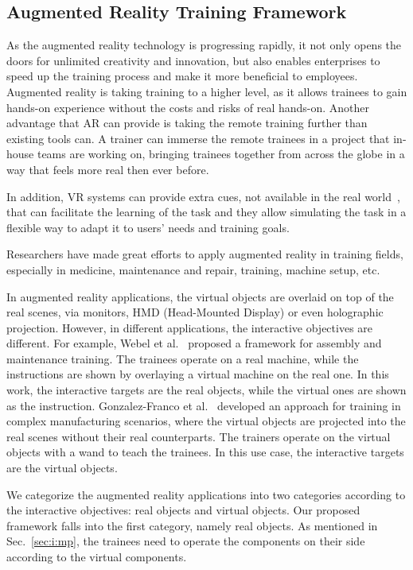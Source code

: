 \subsection{Augmented Reality Training Framework}

As the augmented reality technology is progressing rapidly, it not only opens the doors for unlimited creativity and innovation, but also enables enterprises to speed up the training process and make it more beneficial to employees.
Augmented reality is taking training to a higher level, as it allows trainees to gain hands-on experience without the costs and risks of real hands-on. Another advantage that AR can provide is taking the remote training further than existing tools can. A trainer can immerse the remote trainees in a project that in-house teams are working on, bringing trainees together from across the globe in a way that feels more real then ever before.

In addition, VR systems can provide extra cues, not available in the real world~\cite{gosselin2010}, that can facilitate the learning of the task and they allow simulating the task in a flexible way to adapt it to users' needs and training goals.

Researchers have made great efforts to apply augmented reality in training fields, especially in medicine, maintenance and repair, training, machine setup, etc.

In augmented reality applications, the virtual objects are overlaid on top of the real scenes, via monitors, HMD (Head-Mounted Display) or even holographic projection. However, in different applications, the interactive objectives are different. For example, Webel et al.~\cite{webel2011} proposed a framework for assembly and maintenance training. The trainees operate on a real machine, while the instructions are shown by overlaying a virtual machine on the real one. In this work, the interactive targets are the real objects, while the virtual ones are shown as the instruction. Gonzalez-Franco et al.~\cite{gonzalez-franco2016} developed an approach for training in complex manufacturing scenarios, where the virtual objects are projected into the real scenes without their real counterparts. The trainers operate on the virtual objects with a wand to teach the trainees. In this use case, the interactive targets are the virtual objects.

We categorize the augmented reality applications into two categories according to the interactive objectives: real objects and virtual objects. Our proposed framework falls into the first category, namely real objects. As mentioned in Sec.~\ref{sec:i:mp}, the trainees need to operate the components on their side according to the virtual components.

